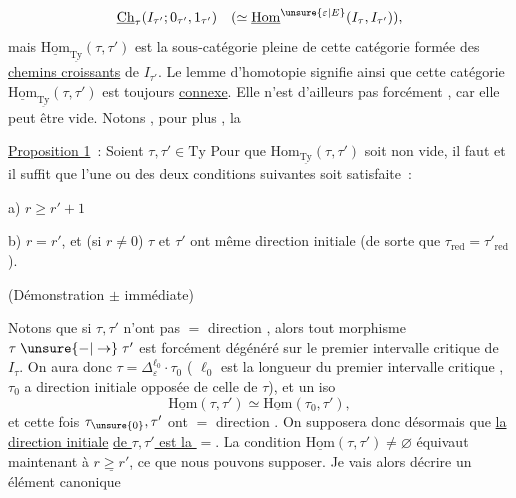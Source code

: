 \[
\underline{\mathrm{Ch}}_\tau(I_{\tau'};0_{\tau'},1_{\tau'})
\quad(\simeq\underline{\mathrm{Hom}}^{\unsure{\varepsilon|E}}(I_\tau,I_{\tau'})),
\]
mais $\underline{\mathrm{Hom}}_{\underline{\mathrm{Ty}}}(\tau,\tau')$ est la sous-catégorie pleine de cette catégorie formée des \uline{chemins croissants} de $I_{\tau'}$. Le lemme d'homotopie signifie ainsi que cette catégorie $\underline{\mathrm{Hom}}_{\underline{\mathrm{Ty}}}(\tau,\tau')$ est  toujours \uline{connexe}. Elle n'est d'ailleurs pas forcément , car elle peut être vide. Notons , pour plus , la

\uline{Proposition 1}~: Soient $\tau,\tau'\in\mathrm{Ty}$ Pour que $\mathrm{Hom}_{\underline{\mathrm{Ty}}}(\tau,\tau')$ soit non vide, il faut et il suffit que l'une ou   des deux conditions suivantes soit satisfaite~:

a) $r\geq r'+1$

b) $r=r'$, et (si $r\ne0$)  $\tau$ et $\tau'$ ont même direction initiale (de sorte que $\tau_{\mathrm{red}}=\tau'_{\mathrm{red}}$).

(Démonstration $\pm$ immédiate)

Notons que si $\tau,\tau'$ n'ont pas $=$ direction , alors tout morphisme $\tau\mathrel{\unsure{-|\to}}\tau'$ est forcément dégénéré sur le premier intervalle critique de $I_\tau$.  On aura donc $\tau=\Delta_\varepsilon^{\ell_0}\cdot\tau_0$ ( $\ell_0$ est la longueur du premier intervalle critique ,  $\tau_0$ a direction initiale opposée de celle de $\tau$), et un iso
\[
\underline{\mathrm{Hom}}(\tau,\tau')\simeq\underline{\mathrm{Hom}}(\tau_0,\tau'),
\]
et cette fois $\tau_{\unsure{0}},\tau'$ ont $=$ direction . On supposera donc désormais que \uline{la direction initiale} \uline{de $\tau,\tau'$ est la $=$}. La condition $\underline{\mathrm{Hom}}(\tau,\tau')\ne\varnothing$ équivaut maintenant à $\underline{r\geq r'}$, ce que nous pouvons supposer. Je vais alors décrire un élément canonique
